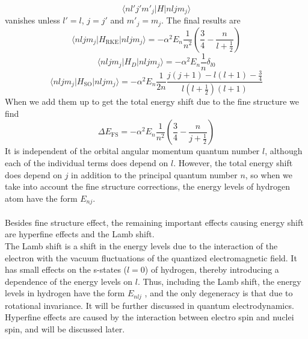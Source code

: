 \[\langle n l' j' m'_j | H | n l j m_j\rangle\]
vanishes unless $l'=l$, $j=j'$ and $m'_j = m_j$. The final results are
\[\langle n l j m_j | H_{\mathrm{RKE}} | n l j m_j\rangle = -\alpha^2 E_n \frac{1}{n^2} \left(\frac{3}{4} - \frac{n}{l+\frac{1}{2}} \right)\]
\[\langle n l j m_j | H_{D} | n l j m_j\rangle = -\alpha^2 E_n \frac{1}{n}\delta_{l0}\]
\[\langle n l j m_j | H_{\mathrm{SO}} | n l j m_j\rangle = -\alpha^2 E_n \frac{1}{2n} \frac{j(j+1)-l(l+1)-\frac{3}{4}}{l(l+\frac{1}{2})(l+1)}\]
When we add them up to get the total energy shift due to the fine structure we find
\[\Delta E_{\mathrm{FS}} = -\alpha^2 E_n \frac{1}{n^2} \left(\frac{3}{4} - \frac{n}{j+\frac{1}{2}} \right)\]
It is independent of the orbital angular momentum quantum number $l$, although each of the individual terms does depend on $l$. However, the total energy shift does depend on $j$ in addition to the principal quantum number $n$, so when we take into account the fine structure corrections, the energy levels of hydrogen atom have the form $E_{nj}$.\\ \\
Besides fine structure effect, the remaining important effects causing energy shift are hyperfine effects and the Lamb shift.\\
The Lamb shift is a shift in the energy levels due to the interaction of the electron with the vacuum fluctuations of the quantized electromagnetic field. It has small effects on the s-states ($l = 0$) of hydrogen, thereby introducing a dependence of the energy levels on $l$. Thus, including the Lamb shift, the energy levels in hydrogen have the form $E_{nlj}$ , and the only degeneracy is that due to rotational invariance. It will be further discussed in quantum electrodynamics.\\
Hyperfine effects are caused by the interaction between electro spin and nuclei spin, and will be discussed later.

